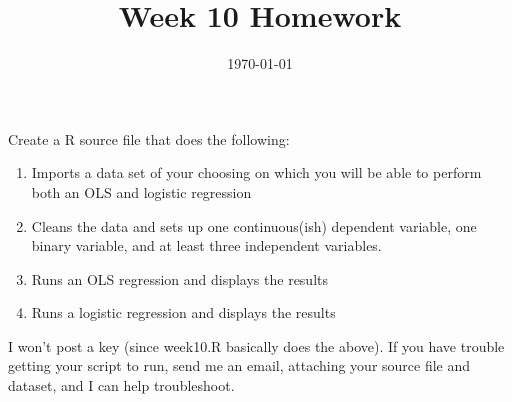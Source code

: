 \documentclass[12pt, oneside]{article}   	%
\title{Week 10 Homework}
\date{\today}							%
\begin{document}
\maketitle

Create a R source file that does the following:

\begin{enumerate}
\item Imports a data set of your choosing on which you will be able to perform both an OLS and logistic regression
\item Cleans the data and sets up one continuous(ish) dependent variable, one binary variable, and at least three independent variables.
\item Runs an OLS regression and displays the results
\item Runs a logistic regression and displays the results
\end{enumerate}

I won't post a key (since week10.R basically does the above). If you have trouble getting your script to run, send me an email, attaching your source file and dataset, and I can help troubleshoot. 
\end{document}
